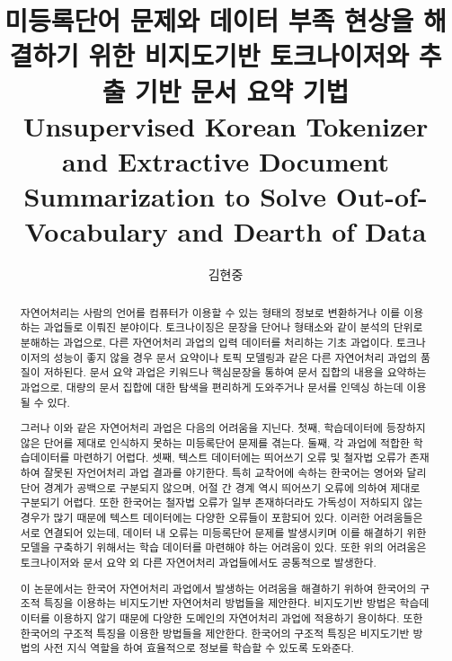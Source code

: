 \documentclass[11pt]{article}
\begin{document}
\title{미등록단어 문제와 데이터 부족 현상을 해결하기 위한 비지도기반 토크나이저와 추출 기반 문서 요약 기법\\
Unsupervised Korean Tokenizer and Extractive Document Summarization to Solve Out-of-Vocabulary and Dearth of Data}
\author{김현중}
\maketitle
\begin{abstract}
자연어처리는 사람의 언어를 컴퓨터가 이용할 수 있는 형태의 정보로 변환하거나 이를 이용하는 과업들로 이뤄진 분야이다.
토크나이징은 문장을 단어나 형태소와 같이 분석의 단위로 분해하는 과업으로, 다른 자연어처리 과업의 입력 데이터를 처리하는 기초 과업이다.
토크나이저의 성능이 좋지 않을 경우 문서 요약이나 토픽 모델링과 같은 다른 자연어처리 과업의 품질이 저하된다.
문서 요약 과업은 키워드나 핵심문장을 통하여 문서 집합의 내용을 요약하는 과업으로, 대량의 문서 집합에 대한 탐색을 편리하게 도와주거나 문서를 인덱싱 하는데 이용될 수 있다.

그러나 이와 같은 자연어처리 과업은 다음의 어려움을 지닌다.
첫째, 학습데이터에 등장하지 않은 단어를 제대로 인식하지 못하는 미등록단어 문제를 겪는다.
둘째, 각 과업에 적합한 학습데이터를 마련하기 어렵다.
셋째, 텍스트 데이터에는 띄어쓰기 오류 및 철자법 오류가 존재하여 잘못된 자언어처리 과업 결과를 야기한다.
특히 교착어에 속하는 한국어는 영어와 달리 단어 경계가 공백으로 구분되지 않으며, 어절 간 경계 역시 띄어쓰기 오류에 의하여 제대로 구분되기 어렵다.
또한 한국어는 철자법 오류가 일부 존재하더라도 가독성이 저하되지 않는 경우가 많기 때문에 텍스트 데이터에는 다양한 오류들이 포함되어 있다.
이러한 어려움들은 서로 연결되어 있는데, 데이터 내 오류는 미등록단어 문제를 발생시키며 이를 해결하기 위한 모델을 구축하기 위해서는 학습 데이터를 마련해야 하는 어려움이 있다.
또한 위의 어려움은 토크나이저와 문서 요약 외 다른 자연어처리 과업들에서도 공통적으로 발생한다.

이 논문에서는 한국어 자연어처리 과업에서 발생하는 어려움을 해결하기 위하여 한국어의 구조적 특징을 이용하는 비지도기반 자연어처리 방법들을 제안한다.
비지도기반 방법은 학습데이터를 이용하지 않기 때문에 다양한 도메인의 자연어처리 과업에 적용하기 용이하다.
또한 한국어의 구조적 특징을 이용한 방법들을 제안한다.
한국어의 구조적 특징은 비지도기반 방법의 사전 지식 역할을 하여 효율적으로 정보를 학습할 수 있도록 도와준다.


\end{abstract}
\end{document}
